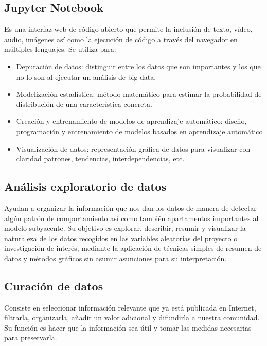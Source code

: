\documentclass[12pt,letterpaper]{article}
\begin{document}
\subsection*{Jupyter Notebook}
Es una interfaz web de código abierto que permite la inclusión de texto, vídeo,
audio, imágenes así como la ejecución de código a través del navegador en
múltiples lenguajes. 
\citep{cabrera_diaz_jupyter}
Se utiliza para: 
\begin{itemize}
\item Depuración de datos: distinguir entre los datos que son importantes y los
que no lo son al ejecutar un análisis de big data.
\item Modelización estadística: método matemático para estimar la probabilidad
de distribución de una característica concreta.
\item Creación y entrenamiento de modelos de aprendizaje automático: diseño,
programación y entrenamiento de modelos basados en aprendizaje automático
\item Visualización de datos: representación gráfica de datos para visualizar
con claridad patrones, tendencias, interdependencias, etc.
\citep{digital_guide_ionos_jupyter}
\end{itemize}

\subsection*{Análisis exploratorio de datos}
Ayudan a organizar la información que nos dan los datos de manera de detectar
algún patrón de comportamiento así como también apartamentos importantes al
modelo subyacente.
\citep{orella_analisis_exploratorio}
Su objetivo es explorar, describir, resumir y visualizar la naturaleza de los
datos recogidos en las variables aleatorias del proyecto o investigación de
interés, mediante la aplicación de técnicas simples de resumen de datos y
métodos gráficos sin asumir asunciones para su interpretación.
\citep{heix_bios_analisis_exploratorio}

\subsection*{Curación de datos}
Consiste en seleccionar información relevante que ya está publicada en
Internet, filtrarla, organizarla, añadir un valor adicional y difundirla a
nuestra comunidad.
\citep{duro_2017}
Su función es hacer que la información sea útil y tomar las medidas necesarias
para preservarla.
\citep{it_user_2020}
\end{document}
